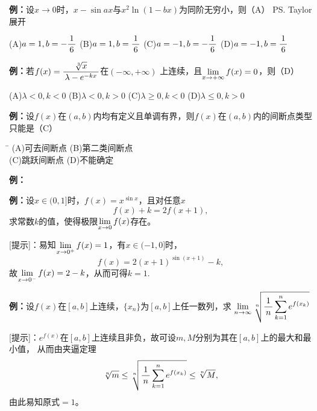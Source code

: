 {\bf 例：}设$x\to 0$时，$x-\sin ax$与$x^2\ln(1-bx)$为同阶无穷小，则（A）
\ps{Taylor展开}

\quad
(A)\;$a=1,b=-\displaystyle\frac{\,{1}\,}{\,{6}\,}$\hspace{1em}
(B)\;$a=1,b=\displaystyle\frac{\,{1}\,}{\,{6}\,}$\hspace{1em}
(C)\;$a=-1,b=-\displaystyle\frac{\,{1}\,}{\,{6}\,}$\hspace{1em}
(D)\;$a=-1,b=\displaystyle\frac{\,{1}\,}{\,{6}\,}$

{\bf 例：}若$f(x)=\displaystyle\frac{\,{\sqrt[3]{x}}\,}{\,{\lambda-e^{-kx}}\,}$在$(-\infty,+\infty)$
上连续，且$\lim\limits_{x\to{+\infty}}f(x)=0$，则（D）

\quad
(A)\;$\lambda<0,k<0$\hspace{1cm}
(B)\;$\lambda<0,k>0$\hspace{1cm}
(C)\;$\lambda\geq0,k<0$\hspace{1cm}
(D)\;$\lambda\leq0,k>0$


{\bf 例：}设$f(x)$在$(a,b)$内均有定义且单调有界，则$f(x)$在$(a,b)$内的间断点类型只能是（C）
\begin{tabbing}
	\hspace{8cm}\=\kill
	\quad\quad\quad
	(A)\;可去间断点 \> 
	(B)\;第二类间断点 \\ 
	\quad\quad\quad
	(C)\;跳跃间断点\>
	(D)\;不能确定
\end{tabbing}



{\bf 例：}



{\bf 例：}设$x\in(0,1]$时，$f(x)=x^{\sin x}$，且对任意$x$
$$f(x)+k=2f(x+1),$$
求常数$k$的值，使得极限$\lim\limits_{x\to{0}}f(x)$存在。

[提示]：易知$\lim\limits_{x\to{0^+}}f(x)=1$，有$x\in(-1,0]$时，
$$f(x)=2(x+1)^{\sin(x+1)}-k,$$
故$\lim\limits_{x\to{0^-}}f(x)=2-k$，从而可得$k=1$.

{\bf 例：}设$f(x)$在$[a,b]$上连续，$\{x_n\}$为$[a,b]$上任一数列，求
$\lim\limits_{n\to\infty}\sqrt[n]{\displaystyle\frac{\,{1}\,}{\,{n}\,}\sum\limits_{k=1}^ne^{f(x_k)}}$

[提示]：$e^{f(x)}$在$[a,b]$上连续且非负，故可设$m,M$分别为其在$[a,b]$上的最大和最小值，
从而由夹逼定理
$$\sqrt[n]m\leq\sqrt[n]{\displaystyle\frac{\,{1}\,}{\,{n}\,}\sum\limits_{k=1}^ne^{f(x_k)}}\leq\sqrt[n]M,$$
由此易知原式$=1$。
